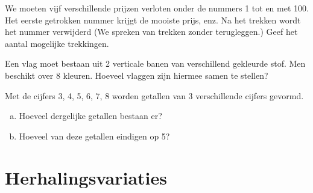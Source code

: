 \documentclass[12pt,twoside]{article}
\begin{document}
\begin{oefening}
We moeten vijf verschillende prijzen verloten onder de nummers 1 tot en met 100.
Het eerste getrokken nummer krijgt de mooiste prijs, enz. Na het trekken wordt het
nummer verwijderd (We spreken van trekken zonder terugleggen.)
Geef het aantal mogelijke trekkingen.
\end{oefening}

\begin{oefening}
Een vlag moet bestaan uit 2 verticale banen van verschillend gekleurde stof.
Men beschikt over 8 kleuren. Hoeveel vlaggen zijn hiermee samen te stellen?
\end{oefening}

\begin{oefening}
Met de cijfers 3, 4, 5, 6, 7, 8 worden getallen van 3 verschillende cijfers gevormd.
\begin{enumerate}[(a)]
  \item Hoeveel dergelijke getallen bestaan er?
  \item Hoeveel van deze getallen eindigen op 5?
\end{enumerate}
\end{oefening}

\pagebreak
\section{Herhalingsvariaties}
\end{document}
